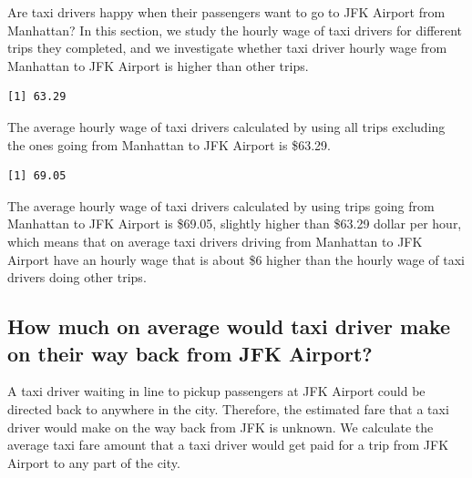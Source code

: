 \documentclass[12pt,twoside]{reedthesis}
\theoremstyle{definition}
\theoremstyle{definition}
\theoremstyle{definition}
\theoremstyle{remark}
\begin{document}
Are taxi drivers happy when their passengers want to go to JFK Airport
from Manhattan? In this section, we study the hourly wage of taxi
drivers for different trips they completed, and we investigate whether
taxi driver hourly wage from Manhattan to JFK Airport is higher than
other trips.
\begin{verbatim}
[1] 63.29
\end{verbatim}
The average hourly wage of taxi drivers calculated by using all trips
excluding the ones going from Manhattan to JFK Airport is \$63.29.
\begin{verbatim}
[1] 69.05
\end{verbatim}
The average hourly wage of taxi drivers calculated by using trips going
from Manhattan to JFK Airport is \$69.05, slightly higher than \$63.29
dollar per hour, which means that on average taxi drivers driving from
Manhattan to JFK Airport have an hourly wage that is about \$6 higher
than the hourly wage of taxi drivers doing other trips.

\subsection{How much on average would taxi driver make on their way back
from JFK
Airport?}\label{how-much-on-average-would-taxi-driver-make-on-their-way-back-from-jfk-airport}

A taxi driver waiting in line to pickup passengers at JFK Airport could
be directed back to anywhere in the city. Therefore, the estimated fare
that a taxi driver would make on the way back from JFK is unknown. We
calculate the average taxi fare amount that a taxi driver would get paid
for a trip from JFK Airport to any part of the city.
\end{document}
